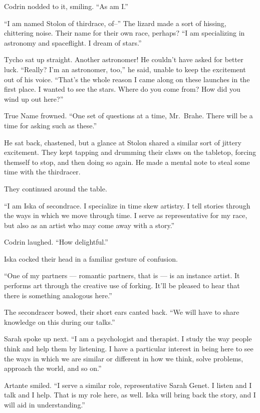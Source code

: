 Codrin nodded to it, smiling. ``As am I.''

``I am named Stolon of thirdrace, of--'' The lizard made a sort of hissing, chittering noise. Their name for their own race, perhaps? ``I am specializing in astronomy and spaceflight. I dream of stars.''

Tycho sat up straight. Another astronomer! He couldn't have asked for better luck. ``Really? I'm an astronomer, too,'' he said, unable to keep the excitement out of his voice. ``That's the whole reason I came along on these launches in the first place. I wanted to see the stars. Where do you come from? How did you wind up out here?''

True Name frowned. ``One set of questions at a time, Mr.~Brahe. There will be a time for asking such as these.''

He sat back, chastened, but a glance at Stolon shared a similar sort of jittery excitement. They kept tapping and drumming their claws on the tabletop, forcing themself to stop, and then doing so again. He made a mental note to steal some time with the thirdracer.

They continued around the table.

``I am Iska of secondrace. I specialize in time skew artistry. I tell stories through the ways in which we move through time. I serve as representative for my race, but also as an artist who may come away with a story.''

Codrin laughed. ``How delightful.''

Iska cocked their head in a familiar gesture of confusion.

``One of my partners — romantic partners, that is — is an instance artist. It performs art through the creative use of forking. It'll be pleased to hear that there is something analogous here.''

The secondracer bowed, their short ears canted back. ``We will have to share knowledge on this during our talks.''

Sarah spoke up next. ``I am a psychologist and therapist. I study the way people think and help them by listening. I have a particular interest in being here to see the ways in which we are similar or different in how we think, solve problems, approach the world, and so on.''

Artante smiled. ``I serve a similar role, representative Sarah Genet. I listen and I talk and I help. That is my role here, as well. Iska will bring back the story, and I will aid in understanding.''

